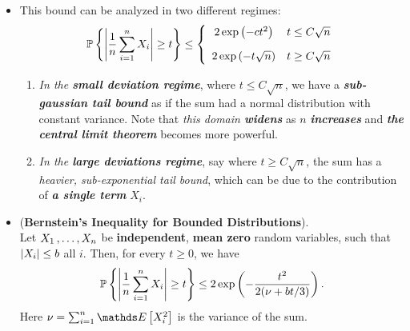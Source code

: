 \documentclass[11pt]{article}
\begin{document}
\begin{itemize}
\item \begin{remark} This bound can be analyzed in two different regimes:
\begin{align*}
{\mathbb P}\left\{\left\lvert \frac{1}{n}\sum_{i=1}^{n}X_i \right\rvert \ge t\right\} \le \left\{\begin{array}{cc}
2 \exp\left(- c t^2\right) &  t\le C \sqrt{n}\\[10pt]
2 \exp\left(-  t\sqrt{n}\right) &  t\ge C \sqrt{n}
\end{array} 
\right. 
\end{align*} 
\begin{enumerate}
\item \emph{In the \textbf{small deviation regime}}, where $t\le C \sqrt{n}$, we have a \emph{\textbf{sub-gaussian tail bound}} as if the sum had a normal distribution with constant variance. Note that \emph{this domain \textbf{widens}} as $n$ \emph{\textbf{increases}} and \emph{\textbf{the central limit theorem}} becomes more powerful. 

\item \emph{In the \textbf{large deviations regime}}, say where $t\ge C \sqrt{n}$, the sum has a \emph{heavier, sub-exponential tail bound}, which can be due to the contribution of \emph{\textbf{a single term}} $X_i$. 
\end{enumerate}
\end{remark}

\item \begin{proposition} (\textbf{Bernstein's Inequality for Bounded Distributions}).  \citep{vershynin2018high}\\
Let $X_1 \,{,}\ldots{,}\, X_n$ be \textbf{independent}, \textbf{mean zero} random variables, such that $\left\lvert X_i \right\rvert \le b$ all $i$. Then, for every $t \ge 0$, we have
\begin{align}
{\mathbb P}\left\{\left\lvert \frac{1}{n}\sum_{i=1}^{n}X_i \right\rvert \ge t\right\} \le 2\exp\left(- \frac{t^2}{2(\nu + bt/3)}\right). \label{ineqn: bernstein_inequality_bounded}
\end{align}
Here $\nu = \sum_{i=1}^{n}\E{}{X_i^2}$ is the variance of the sum.
\end{proposition}


\end{itemize}
\end{document}
